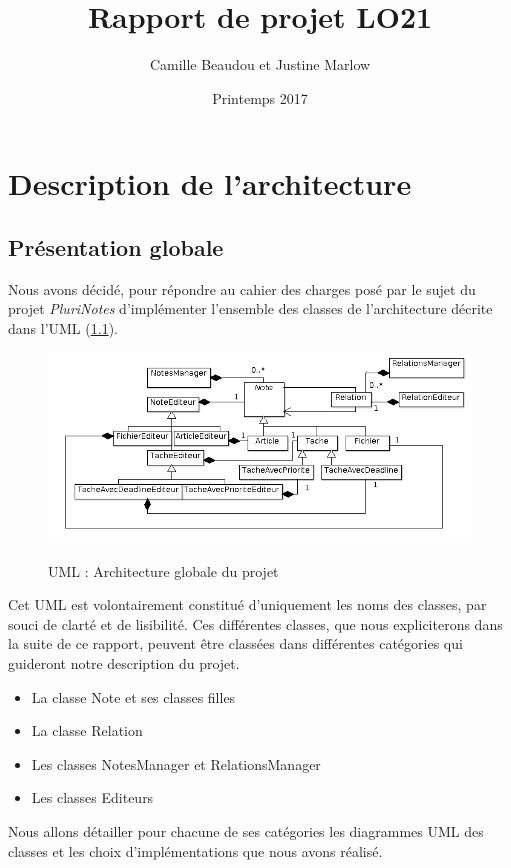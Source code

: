 \documentclass[a4paper,10pt]{report}
\begin{document}
\title{Rapport de projet LO21}
\author{Camille Beaudou et Justine Marlow}
\date{Printemps 2017}
\maketitle
{}
\tableofcontents
\newpage

\chapter{Description de l'architecture}
\section{Présentation globale}
Nous avons décidé, pour répondre au cahier des charges posé par le sujet du projet \textit{PluriNotes} d'implémenter l'ensemble des classes de l'architecture décrite dans l'UML (\ref{UML_global}).
\begin{center}
\begin{figure}[H]
\caption{UML : Architecture globale du projet}
\includegraphics[width=\textwidth]{UML_global.png}
\label{UML_global}
\end{figure}
\end{center}
Cet UML est volontairement constitué d'uniquement les noms des classes, par souci de clarté et de lisibilité. Ces différentes classes, que nous expliciterons dans la suite de ce rapport, peuvent être classées dans différentes catégories qui guideront notre description du projet.
\begin{itemize}
\item La classe Note et ses classes filles
\item La classe Relation
\item Les classes NotesManager et RelationsManager
\item Les classes Editeurs
\end{itemize}
Nous allons détailler pour chacune de ses catégories les diagrammes UML des classes et les choix d'implémentations que nous avons réalisé.
\end{document}
